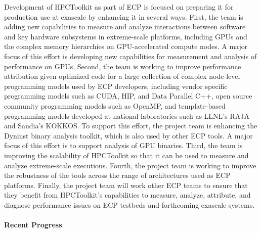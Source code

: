Development of HPCToolkit as part of ECP is focused on preparing it
for production use at exascale by enhancing it in several ways. First,
the team is adding new capabilities to measure and analyze
interactions between software and key hardware subsystems in
extreme-scale platforms, including GPUs and the complex memory hierarchies on GPU-accelerated compute nodes. A major focus of this effort is developing new capabilities for 
measurement and analysis of performance on GPUs.
Second, the team is working to improve performance
attribution given optimized code for a large collection of complex node-level programming
models used by ECP developers, including 
vendor specific programming models such as CUDA, HIP, and Data Parallel C++,
open source community programming models such as OpenMP,
and template-based programming models developed at national laboratories such as LLNL's RAJA and Sandia's KOKKOS. To support
this effort, the project team is enhancing the Dyninst binary analysis
toolkit, which is also used by other ECP tools. A major focus of this effort 
is to support analysis of GPU binaries. Third, the team is
improving the scalability of HPCToolkit so that it can be used to
measure and analyze extreme-scale executions. Fourth, the project team
is working to improve the robustness of the tools across the range of
architectures used as ECP platforms. Finally, the project team will
work other ECP teams to ensure that they benefit from HPCToolkit's
capabilities to measure, analyze, attribute, and diagnose performance
issues on ECP testbeds and forthcoming exascale systems.

\newpage
\paragraph{Recent Progress}

